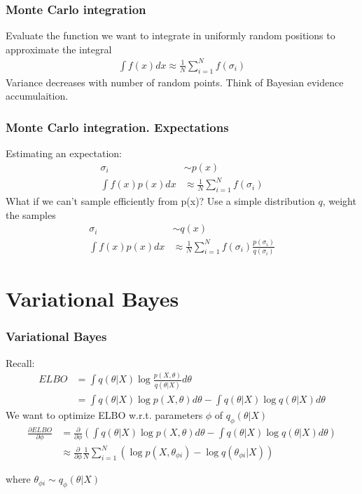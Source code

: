 \documentclass[xcolor=svgnames,table]{beamer}
\begin{document}
\begin{frame}
\frametitle{Monte Carlo integration}
Evaluate the function we want to integrate in uniformly random positions to approximate the integral
\begin{align}
\int f(x) dx \approx \frac{1}{N} \sum_{i=1}^N f(\sigma_i)
\end{align}
Variance decreases with number of random points. Think of Bayesian evidence accumulaition.
\end{frame}

\begin{frame}
\frametitle{Monte Carlo integration. Expectations}
Estimating an expectation:
\begin{align}
\sigma_i &\sim p(x) \\
\int f(x) p(x) dx &\approx \frac{1}{N} \sum_{i=1}^N f(\sigma_i)
\end{align}
What if we can't sample efficiently from p(x)? Use a simple distribution $q$, weight the samples
\begin{align}
\sigma_i &\sim q(x) \\
\int f(x) p(x) dx &\approx \frac{1}{N} \sum_{i=1}^N f(\sigma_i) \frac{p(\sigma_i)} {q(\sigma_i)}
\end{align}
\end{frame}

\section{Variational Bayes}
\begin{frame}
\frametitle{Variational Bayes}
Recall: 
\begin{align}
    ELBO &= \int q(\theta | X) \log \frac{p(X, \theta)}{q(\theta | X)} d\theta \\
    &= \int q(\theta | X) \log p(X, \theta) d\theta - \int q(\theta | X) \log q(\theta | X) d\theta
\end{align}
We want to optimize ELBO w.r.t. parameters $\phi$ of $q_{\phi}(\theta | X)$
\begin{align}
    \frac{\partial ELBO}{\partial \phi} &= \frac{\partial}{\partial \phi} \left(  \int q(\theta | X) \log p(X, \theta) d\theta - \int q(\theta | X) \log q(\theta | X) d\theta \right) \\
    &\approx \frac{\partial}{\partial \phi} \frac{1}{N} \sum_{i=1}^N \left(  \log p(X, \theta_{\phi i}) - \log q(\theta_{\phi i} | X) \right) 
\end{align}

where $\theta_{\phi i} \sim q_{\phi}(\theta | X)$

\end{frame}
\end{document}
